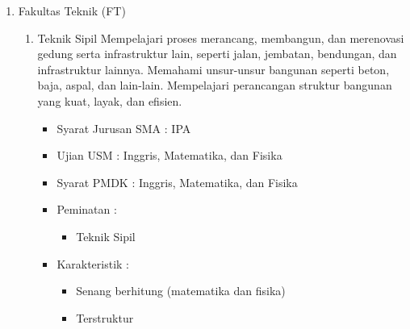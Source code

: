 \documentclass[a4paper,twoside]{article}
\begin{document}
\begin{enumerate}
\begin{enumerate}
			\item Fakultas Teknik (FT)
			\begin{enumerate}
				\item Teknik Sipil
					Mempelajari proses merancang, membangun, dan merenovasi gedung serta infrastruktur lain, seperti jalan, jembatan, bendungan, dan infrastruktur lainnya. Memahami unsur-unsur bangunan seperti beton, baja, aspal, dan lain-lain. Mempelajari perancangan struktur bangunan yang kuat, layak, dan efisien.
					\begin{itemize}
						\item Syarat Jurusan SMA : IPA
						\item Ujian USM : Inggris, Matematika, dan Fisika
						\item Syarat PMDK : Inggris, Matematika, dan Fisika
						\item Peminatan :
						\begin{itemize}
							\item Teknik Sipil
						\end{itemize}
						\item Karakteristik :
						\begin{itemize}
							\item Senang berhitung (matematika dan fisika)
							\item Terstruktur
						\end{itemize}
					\end{itemize}
					

\end{enumerate}
\end{enumerate}
\end{enumerate}
\end{document}
